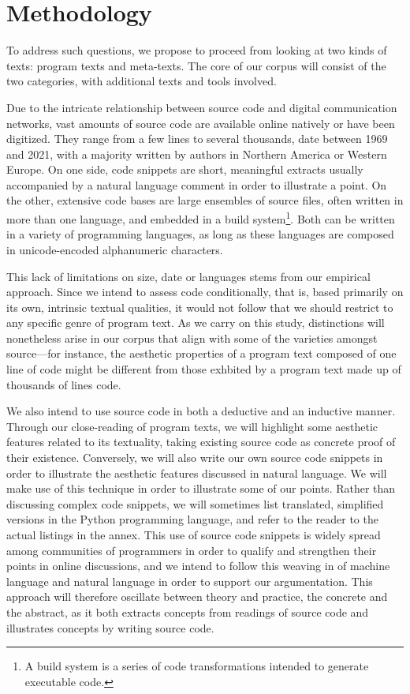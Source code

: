 \section{Methodology}
\label{sec:methodology}

To address such questions, we propose to proceed from looking at two kinds of texts: program texts and meta-texts. The core of our corpus will consist of the two categories, with additional texts and tools involved.

Due to the intricate relationship between source code and digital communication networks, vast amounts of source code are available online natively or have been digitized. They range from a few lines to several thousands, date between 1969 and 2021, with a majority written by authors in Northern America or Western Europe. On one side, code snippets are short, meaningful extracts usually accompanied by a natural language comment in order to illustrate a point. On the other, extensive code bases are large ensembles of source files, often written in more than one language, and embedded in a build system\footnote{A build system is a series of code transformations intended to generate executable code.}. Both can be written in a variety of programming languages, as long as these languages are composed in unicode-encoded alphanumeric characters.

This lack of limitations on size, date or languages stems from our empirical approach. Since we intend to assess code conditionally, that is, based primarily on its own, intrinsic textual qualities, it would not follow that we should restrict to any specific genre of program text. As we carry on this study, distinctions will nonetheless arise in our corpus that align with some of the varieties amongst source—for instance, the aesthetic properties of a program text composed of one line of code might be different from those exhbited by a program text made up of thousands of lines code.

We also intend to use source code in both a deductive and an inductive manner. Through our close-reading of program texts, we will highlight some aesthetic features related to its textuality, taking existing source code as concrete proof of their existence. Conversely, we will also write our own source code snippets in order to illustrate the aesthetic features discussed in natural language. We will make use of this technique in order to illustrate some of our points. Rather than discussing complex code snippets, we will sometimes list translated, simplified versions in the Python programming language, and refer to the reader to the actual listings in the annex. This use of source code snippets is widely spread among communities of programmers in order to qualify and strengthen their points in online discussions, and we intend to follow this weaving in of machine language and natural language in order to support our argumentation. This approach will therefore oscillate between theory and practice, the concrete and the abstract, as it both extracts concepts from readings of source code and illustrates concepts by writing source code.

